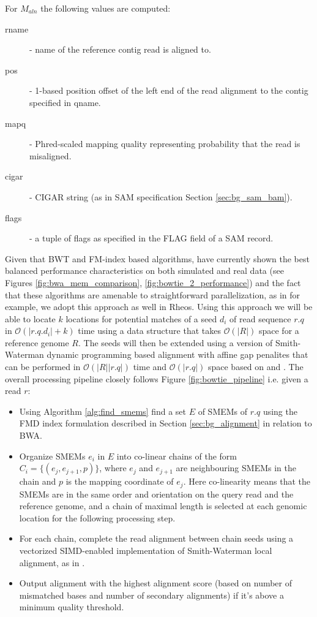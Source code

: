 For $M_{aln}$ the following values are computed:

\begin{description}
    \item [rname] - name of the reference contig read is aligned to.
    \item [pos] - 1-based position offset of the left end of the read alignment to the contig specified in qname.
    \item [mapq] - Phred-scaled mapping quality representing probability that the read is misaligned.
    \item [cigar] - CIGAR string (as in SAM specification Section \ref{sec:bg_sam_bam}).
    \item [flags] - a tuple of flags as specified in the FLAG field of a SAM record.
\end{description}

Given that BWT and FM-index based algorithms\autocite{langmead2012fast},\autocite{Li2013} have currently shown the best balanced performance characteristics on both simulated and real data (see Figures \ref{fig:bwa_mem_comparison}, \ref{fig:bowtie_2_performance}) and the fact that these algorithms are amenable to straightforward parallelization, as in \autocite{langmead2009searching} for example, we adopt this approach as well in Rheos. Using this approach we will be able to locate $k$ locations for potential matches of a seed $d_i$ of read sequence $r.q$ in $\mathcal{O}(|r.q.d_i| + k)$ time using a data structure that takes $\mathcal{O}(|R|)$ space for a reference genome $R$. The seeds will then be extended using a version of Smith-Waterman\autocite{smith1981comparison} dynamic programming based alignment with affine gap penalites that can be performed in $\mathcal{O}(|R||r.q|)$ time and $\mathcal{O}(|r.q|)$ space based on \autocite{myers1988optimal} and \autocite{farrar2006striped}. The overall processing pipeline closely follows Figure \ref{fig:bowtie_pipeline} i.e. given a read $r$: 

\begin{itemize}
    \item Using Algorithm \ref{alg:find_smems} find a set $E$ of SMEMs of $r.q$\autocite{Li2013} using the FMD index formulation described in Section \ref{sec:bg_alignment} in relation to BWA. 
    \item Organize SMEMs $e_i$ in $E$ into co-linear chains of the form $C_i = \{(e_j,e_{j+1},p)\}$, where $e_j$ and $e_{j+1}$ are neighbouring SMEMs in the chain and $p$ is the mapping coordinate of $e_j$. Here co-linearity means that the SMEMs are in the same order and orientation on the query read and the reference genome, and a chain of maximal length is selected at each genomic location for the following processing step.
    \item For each chain, complete the read alignment between chain seeds using a vectorized SIMD-enabled implementation of Smith-Waterman local alignment, as in \autocite{farrar2006striped}.
    \item Output alignment with the highest alignment score (based on number of mismatched bases and number of secondary alignments) if it's above a minimum quality threshold. 
\end{itemize}

